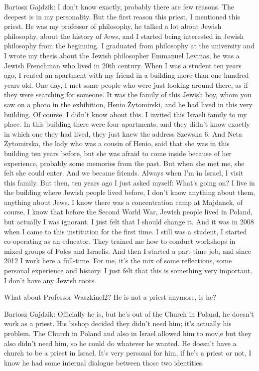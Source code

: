 Bartosz Gajdzik: I don’t know exactly, probably there are few reasons. The deepest is in my personality. But the first reason this priest, I mentioned this priest. He was my professor of philosophy, he talked a lot about Jewish philosophy, about the history of Jews, and I started being interested in Jewish philosophy from the beginning. I graduated from philosophy at the university and I wrote my thesis about the Jewish philosopher Emmanuel Levinas, he was a Jewish Frenchman who lived in 20th century. When I was a student ten years ago, I rented an apartment with my friend in a building more than one hundred years old. One day, I met some people who were just looking around there, as if they were searching for someone. It was the family of this Jewish boy, whom you saw on a photo in the exhibition, Henio Żytomirski, and he had lived in this very building. Of course, I didn’t know about this. I invited this Israeli family to my place. In this building there were four apartments, and they didn’t know exactly in which one they had lived, they just knew the address Szewska 6. And Neta Żytomirska, the lady who was a cousin of Henio, said that she was in this building ten years before, but she was afraid to come inside because of her experience, probably some memories from the past. But when she met me, she felt she could enter. And we became friends. Always when I’m in Israel, I visit this family. But then, ten years ago I just asked myself: What’s going on? I live in the building where Jewish people lived before, I don’t know anything about them, anything about Jews. I know there was a concentration camp at Majdanek, of course, I know that before the Second World War, Jewish people lived in Poland, but actually I was ignorant. I just felt that I should change it. And it was in 2008 when I came to this institution for the first time. I still was a student, I started co-operating as an educator. They trained me how to conduct workshops in mixed groups of Poles and Israelis. And then I started a part-time job, and since 2012 I work here a full-time. For me, it’s the mix of some reflections, some personal experience and history. I just felt that this is something very important. I don’t have any Jewish roots. 

What about Professor Waszkinel2? He is not a priest anymore, is he? 

Bartosz Gajdzik: Officially he is, but he’s out of the Church in Poland, he doesn’t work as a priest. His bishop decided they didn’t need him; it’s actually his problem. The Church in Poland and also in Israel allowed him to mov,e but they also didn’t need him, so he could do whatever he wanted. He doesn’t have a church to be a priest in Israel. It’s very personal for him, if he’s a priest or not, I know he had some internal dialogue between those two identities.  

